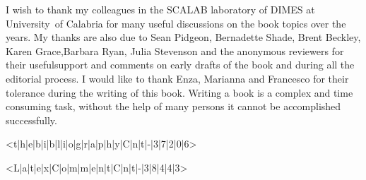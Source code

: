 I wish to thank my colleagues in the SCALAB laboratory of DIMES at \hbox{University of} Calabria for many useful discussions on the book topics over the years. My thanks are also due to Sean Pidgeon, Bernadette Shade, Brent Beckley, Karen Grace,\break Barbara Ryan, Julia Stevenson and the anonymous reviewers for their useful\break support and comments on early drafts of the book and during all the editorial process. I would like to thank Enza, Marianna and Francesco for their tolerance during the writing of this book. Writing a book is a complex and time consuming task, without the help of many persons it cannot be accomplished successfully.

<t|h|e|b|i|b|l|i|o|g|r|a|p|h|y|C|n|t|-|3|7|2|0|6>

<L|a|t|e|x|C|o|m|m|e|n|t|C|n|t|-|3|8|4|4|3>

